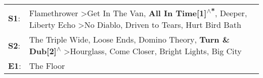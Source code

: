 \begin{supertabular}{p{0.03\textwidth}p{0.92\textwidth}}
 \textbf{S1}:  &  Flamethrower\textsuperscript{} \textgreater \enspace Get In The Van\textsuperscript{}, \enspace \textbf{All In Time[1]\textsuperscript{$\wedge$*}}, \enspace Deeper\textsuperscript{}, \enspace Liberty Echo\textsuperscript{} \textgreater \enspace No Diablo\textsuperscript{}, \enspace Driven to Tears\textsuperscript{}, \enspace Hurt Bird Bath\textsuperscript{}  \enspace  \\
 \textbf{S2}:  &                                             The Triple Wide\textsuperscript{}, \enspace Loose Ends\textsuperscript{}, \enspace Domino Theory\textsuperscript{}, \enspace \textbf{Turn \& Dub[2]\textsuperscript{$\wedge$}} \textgreater \enspace Hourglass\textsuperscript{}, \enspace Come Closer\textsuperscript{}, \enspace Bright Lights, Big City\textsuperscript{}  \enspace  \\
 \textbf{E1}:  &                                                                                                                                                                                                                                                                                                                                              The Floor\textsuperscript{}  \enspace  \\
\end{supertabular}

